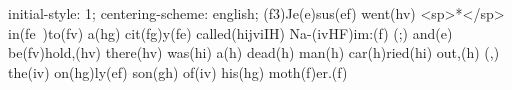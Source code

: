 initial-style: 1;
centering-scheme: english;
(f3)Je(e)sus(ef) went(hv) <sp>*</sp> in(fe~)to(fv) a(hg) cit(fg)y(fe) called(hijviIH) Na-(ivHF)im:(f) (;) and(e) be(fv)hold,(hv) there(hv) was(hi) a(h) dead(h) man(h) car(h)ried(hi) out,(h) (,) the(iv) on(hg)ly(ef) son(gh) of(iv) his(hg) moth(f)er.(f)
